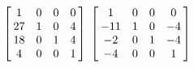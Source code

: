 {$\left[\hskip -3pt \begin{array}{cccc} 1&0&0&0\\  27&1&0&4
\\  18&0&1&4\\  4&0&0&1\end {array} \hskip -3pt
 \right]$ 
}
{$ \left[\hskip -3pt \begin{array}{cccc} 1&0&0&0\\  -11&1&0&-4
\\  -2&0&1&-4\\  -4&0&0&1\end {array} \hskip -3pt
 \right] $}
